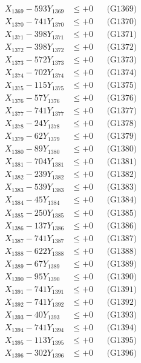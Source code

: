 \documentclass[a4paper,10pt]{article}
\begin{document}
{\begin{align}
X_{1369} - 593Y_{1369} &\leq +0 && \text{(G1369)} \\
X_{1370} - 741Y_{1370} &\leq +0 && \text{(G1370)} \\
\allowbreak
X_{1371} - 398Y_{1371} &\leq +0 && \text{(G1371)} \\
X_{1372} - 398Y_{1372} &\leq +0 && \text{(G1372)} \\
X_{1373} - 572Y_{1373} &\leq +0 && \text{(G1373)} \\
X_{1374} - 702Y_{1374} &\leq +0 && \text{(G1374)} \\
X_{1375} - 115Y_{1375} &\leq +0 && \text{(G1375)} \\
X_{1376} - 57Y_{1376} &\leq +0 && \text{(G1376)} \\
X_{1377} - 741Y_{1377} &\leq +0 && \text{(G1377)} \\
X_{1378} - 24Y_{1378} &\leq +0 && \text{(G1378)} \\
X_{1379} - 62Y_{1379} &\leq +0 && \text{(G1379)} \\
X_{1380} - 89Y_{1380} &\leq +0 && \text{(G1380)} \\
\allowbreak
X_{1381} - 704Y_{1381} &\leq +0 && \text{(G1381)} \\
X_{1382} - 239Y_{1382} &\leq +0 && \text{(G1382)} \\
X_{1383} - 539Y_{1383} &\leq +0 && \text{(G1383)} \\
X_{1384} - 45Y_{1384} &\leq +0 && \text{(G1384)} \\
X_{1385} - 250Y_{1385} &\leq +0 && \text{(G1385)} \\
X_{1386} - 137Y_{1386} &\leq +0 && \text{(G1386)} \\
X_{1387} - 741Y_{1387} &\leq +0 && \text{(G1387)} \\
X_{1388} - 622Y_{1388} &\leq +0 && \text{(G1388)} \\
X_{1389} - 67Y_{1389} &\leq +0 && \text{(G1389)} \\
X_{1390} - 95Y_{1390} &\leq +0 && \text{(G1390)} \\
\allowbreak
X_{1391} - 741Y_{1391} &\leq +0 && \text{(G1391)} \\
X_{1392} - 741Y_{1392} &\leq +0 && \text{(G1392)} \\
X_{1393} - 40Y_{1393} &\leq +0 && \text{(G1393)} \\
X_{1394} - 741Y_{1394} &\leq +0 && \text{(G1394)} \\
X_{1395} - 113Y_{1395} &\leq +0 && \text{(G1395)} \\
X_{1396} - 302Y_{1396} &\leq +0 && \text{(G1396)} \\

\end{align}}
\end{document}
